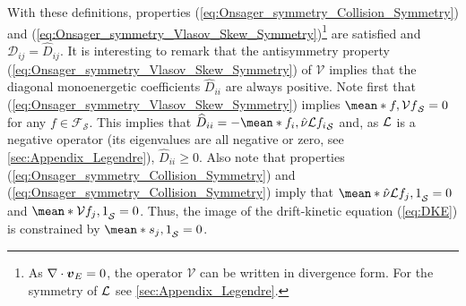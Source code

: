 With these definitions, properties (\ref{eq:Onsager_symmetry_Collision_Symmetry}) and (\ref{eq:Onsager_symmetry_Vlasov_Skew_Symmetry})\footnote{As $\nabla \cdot \vb*{v}_E =0$, the operator $\mathcal{V}$ can be written in divergence form. For the symmetry of $\mathcal{L}$ see \ref{sec:Appendix_Legendre}.} are satisfied and $\mathcal{D}_{ij} = \widehat{D}_{ij} $. It is interesting to remark that the antisymmetry property (\ref{eq:Onsager_symmetry_Vlasov_Skew_Symmetry}) of $\mathcal{V}$ implies that the diagonal monoenergetic coefficients $\widehat{D}_{ii} $ are always positive. Note first that (\ref{eq:Onsager_symmetry_Vlasov_Skew_Symmetry}) implies $\mean*{f, \mathcal{V} f}_{\mathcal{S}} = 0$ for any $f\in \mathcal{F}_{\mathcal{S}}$. This implies that $\widehat{D}_{ii} = - \mean*{f_i, \hat{\nu}\Lorentz f_i}_{\mathcal{S}} $ and, as $\mathcal{L}$ is a negative operator (its eigenvalues are all negative or zero, see \ref{sec:Appendix_Legendre}), $\widehat{D}_{ii} \ge 0$. Also note that properties (\ref{eq:Onsager_symmetry_Collision_Symmetry}) and (\ref{eq:Onsager_symmetry_Collision_Symmetry}) imply that $\mean*{\hat{\nu}\mathcal{L}f_j,1}_{\mathcal{S}} = 0$ and $\mean*{\mathcal{V}f_j,1}_{\mathcal{S}} = 0$. Thus, the image of the drift-kinetic equation (\ref{eq:DKE}) is constrained by $\mean*{s_j,1}_{\mathcal{S}} = 0$.

